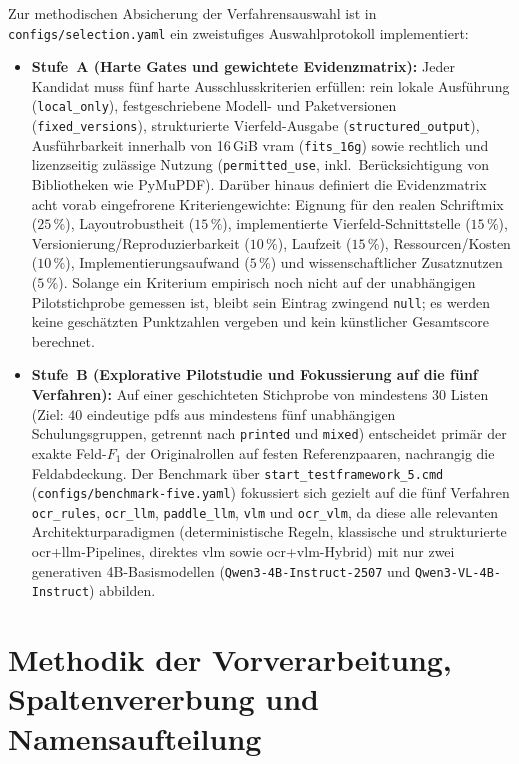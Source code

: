 Zur methodischen Absicherung der Verfahrensauswahl ist in \texttt{configs/selection.yaml} ein zweistufiges Auswahlprotokoll implementiert:
\begin{itemize}
  \item \textbf{Stufe~A (Harte Gates und gewichtete Evidenzmatrix):} Jeder Kandidat muss fünf harte Ausschlusskriterien erfüllen: rein lokale Ausführung (\texttt{local\_only}), festgeschriebene Modell- und Paketversionen (\texttt{fixed\_versions}), strukturierte Vierfeld-Ausgabe (\texttt{structured\_output}), Ausführbarkeit innerhalb von \mbox{16\,GiB} \ac{vram} (\texttt{fits\_16g}) sowie rechtlich und lizenzseitig zulässige Nutzung (\texttt{permitted\_use}, inkl.\ Berücksichtigung von Bibliotheken wie PyMuPDF). Darüber hinaus definiert die Evidenzmatrix acht vorab eingefrorene Kriteriengewichte: Eignung für den realen Schriftmix ($25\,\%$), Layoutrobustheit ($15\,\%$), implementierte Vierfeld-Schnittstelle ($15\,\%$), Versionierung/Reproduzierbarkeit ($10\,\%$), Laufzeit ($15\,\%$), Ressourcen/Kosten ($10\,\%$), Implementierungsaufwand ($5\,\%$) und wissenschaftlicher Zusatznutzen ($5\,\%$). Solange ein Kriterium empirisch noch nicht auf der unabhängigen Pilotstichprobe gemessen ist, bleibt sein Eintrag zwingend \texttt{null}; es werden keine geschätzten Punktzahlen vergeben und kein künstlicher Gesamtscore berechnet.
  \item \textbf{Stufe~B (Explorative Pilotstudie und Fokussierung auf die fünf Verfahren):} Auf einer geschichteten Stichprobe von mindestens $30$ Listen (Ziel: $40$ eindeutige \acp{pdf} aus mindestens fünf unabhängigen Schulungsgruppen, getrennt nach \texttt{printed} und \texttt{mixed}) entscheidet primär der exakte Feld-$F_1$ der Originalrollen auf festen Referenzpaaren, nachrangig die Feldabdeckung. Der Benchmark über \texttt{start\_testframework\_5.cmd} (\texttt{configs/benchmark-five.yaml}) fokussiert sich gezielt auf die fünf Verfahren \texttt{ocr\_rules}, \texttt{ocr\_llm}, \texttt{paddle\_llm}, \texttt{vlm} und \texttt{ocr\_vlm}, da diese alle relevanten Architekturparadigmen (deterministische Regeln, klassische und strukturierte \ac{ocr}+\ac{llm}-Pipelines, direktes \ac{vlm} sowie \ac{ocr}+\ac{vlm}-Hybrid) mit nur zwei generativen 4B-Basismodellen (\texttt{Qwen3-4B-Instruct-2507} und \texttt{Qwen3-VL-4B-Instruct}) abbilden.
\end{itemize}

\section{Methodik der Vorverarbeitung, Spaltenvererbung und Namensaufteilung}
\label{sec:methodik-vorverarbeitung}

